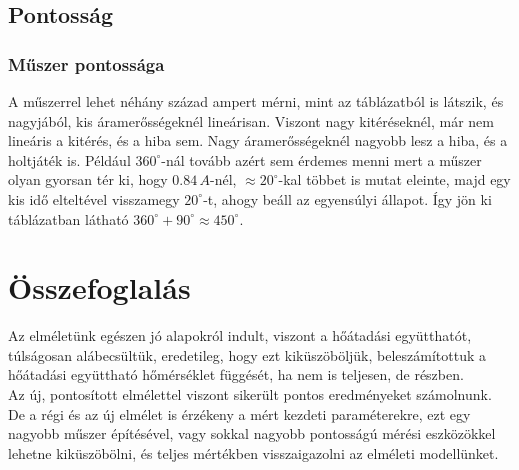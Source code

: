 \documentclass[a4paper, 10pt, oneside]{article}
\begin{document}
\subsection{Pontosság}

\subsubsection*{Műszer pontossága}
A műszerrel lehet néhány század ampert mérni, mint az  táblázatból is látszik, és nagyjából, 
kis áramerősségeknél lineárisan. Viszont nagy kitéréseknél, már nem lineáris a kitérés, és a hiba sem. Nagy 
áramerősségeknél nagyobb lesz a hiba, és a holtjáték is. Például $360^\circ$-nál tovább azért sem érdemes menni
mert a műszer olyan gyorsan tér ki, hogy $0.84\, A$-nél, $\approx20^\circ$-kal többet is mutat eleinte, majd egy kis idő 
elteltével visszamegy $20^\circ$-t, ahogy beáll az egyensúlyi állapot. Így jön ki  táblázatban
látható $360^\circ+90^\circ \approx 450^\circ$.

\section{Összefoglalás}

Az elméletünk egészen jó alapokról indult, viszont a hőátadási együtthatót, túlságosan alábecsültük, eredetileg,
hogy ezt kiküszöböljük, beleszámítottuk a hőátadási együttható hőmérséklet függését, ha nem is teljesen, de részben.\\

Az új, pontosított elmélettel viszont sikerült pontos eredményeket számolnunk.
De a régi és az új elmélet is érzékeny a mért kezdeti paraméterekre, ezt egy nagyobb műszer építésével, vagy 
sokkal nagyobb pontosságú mérési eszközökkel lehetne kiküszöbölni, és teljes mértékben visszaigazolni az 
elméleti modellünket.

\end{document}
